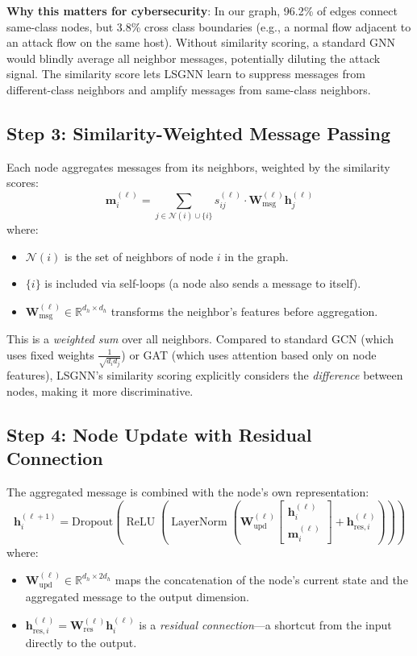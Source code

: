 \documentclass[conference]{IEEEtran}
\newcommand{\R}{\mathbb{R}}
\newcommand{\N}{\mathcal{N}}
\newcommand{\vect}[1]{\bm{#1}}
\newcommand{\mat}[1]{\mathbf{#1}}
\DeclareMathOperator{\ReLU}{ReLU}
\DeclareMathOperator{\LN}{LayerNorm}
\begin{document}
\textbf{Why this matters for cybersecurity}: In our graph, 96.2\% of edges connect same-class nodes, but 3.8\% cross class boundaries (e.g., a normal flow adjacent to an attack flow on the same host). Without similarity scoring, a standard GNN would blindly average all neighbor messages, potentially diluting the attack signal. The similarity score lets LSGNN learn to suppress messages from different-class neighbors and amplify messages from same-class neighbors.

\subsection{Step 3: Similarity-Weighted Message Passing}

Each node aggregates messages from its neighbors, weighted by the similarity scores:
\begin{equation}
    \vect{m}_i^{(\ell)} = \sum_{j \in \N(i) \cup \{i\}} s_{ij}^{(\ell)} \cdot \mat{W}_{\text{msg}}^{(\ell)} \vect{h}_j^{(\ell)}
\end{equation}
where:
\begin{itemize}
    \item $\N(i)$ is the set of neighbors of node $i$ in the graph.
    \item $\{i\}$ is included via self-loops (a node also sends a message to itself).
    \item $\mat{W}_{\text{msg}}^{(\ell)} \in \R^{d_h \times d_h}$ transforms the neighbor's features before aggregation.
\end{itemize}

This is a \emph{weighted sum} over all neighbors. Compared to standard GCN (which uses fixed weights $\frac{1}{\sqrt{d_i d_j}}$) or GAT (which uses attention based only on node features), LSGNN's similarity scoring explicitly considers the \emph{difference} between nodes, making it more discriminative.

\subsection{Step 4: Node Update with Residual Connection}

The aggregated message is combined with the node's own representation:
\begin{equation}
    \vect{h}_i^{(\ell+1)} = \text{Dropout}\!\left(\ReLU\!\left(\LN\!\left(\mat{W}_{\text{upd}}^{(\ell)} \begin{bmatrix} \vect{h}_i^{(\ell)} \\ \vect{m}_i^{(\ell)} \end{bmatrix} + \vect{h}_{\text{res},i}^{(\ell)}\right)\right)\right)
\end{equation}
where:
\begin{itemize}
    \item $\mat{W}_{\text{upd}}^{(\ell)} \in \R^{d_h \times 2d_h}$ maps the concatenation of the node's current state and the aggregated message to the output dimension.
    \item $\vect{h}_{\text{res},i}^{(\ell)} = \mat{W}_{\text{res}}^{(\ell)} \vect{h}_i^{(\ell)}$ is a \emph{residual connection}---a shortcut from the input directly to the output.
\end{itemize}
\end{document}
